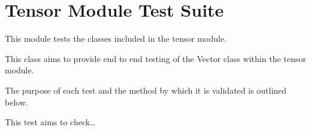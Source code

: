 \documentclass[letterpaper,10pt,english]{sphinxmanual}
\begin{document}
\chapter{Tensor Module Test Suite}
\label{\detokenize{index:tensor-module-test-suite}}\label{\detokenize{index:module-tests.test_tensor}}
\sphinxAtStartPar
This module tests the classes included in the tensor module.

\begin{fulllineitems}
\label{\detokenize{index:tests.test_tensor.TestOperator}}
\pysigstartsignatures
{}
\pysigstopsignatures
\end{fulllineitems}


\begin{fulllineitems}
\label{\detokenize{index:tests.test_tensor.TestVector}}
\pysigstartsignatures
{}
\pysigstopsignatures
\sphinxAtStartPar
This class aims to provide end to end testing of the
Vector class within the tensor module.

\sphinxAtStartPar
The purpose of each test and the method by which it
is validated is outlined below.

\begin{fulllineitems}
\label{\detokenize{index:tests.test_tensor.TestVector.test_vector_construction}}
\pysigstartsignatures
{}
\pysigstopsignatures
\sphinxAtStartPar
This test aims to check…

\end{fulllineitems}


\end{fulllineitems}
\end{document}
